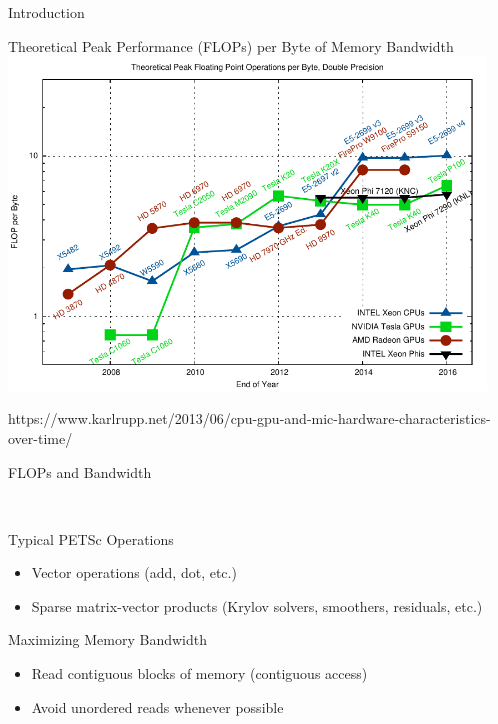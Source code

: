 \begin{frame}{Introduction}
 \vspace*{-0.5cm}
 \begin{center}
  Theoretical Peak Performance (FLOPs) per Byte of Memory Bandwidth \\
  \includegraphics[width=0.95\textwidth]{figures/flop-per-byte-dp}
 \end{center}
 \vspace*{-0.5cm}
 {\tiny https://www.karlrupp.net/2013/06/cpu-gpu-and-mic-hardware-characteristics-over-time/ }
\end{frame}



\begin{frame}[fragile]{FLOPs and Bandwidth}

\  \begin{block}{Typical PETSc Operations}
  \begin{itemize}
   \item Vector operations (add, dot, etc.)
   \item Sparse matrix-vector products (Krylov solvers, smoothers, residuals, etc.)
  \end{itemize}
 \end{block}

 \begin{block}{Maximizing Memory Bandwidth}
  \begin{itemize}
   \item Read contiguous blocks of memory (contiguous access)
   \item Avoid unordered reads whenever possible
  \end{itemize}
 \end{block}

\end{frame}



